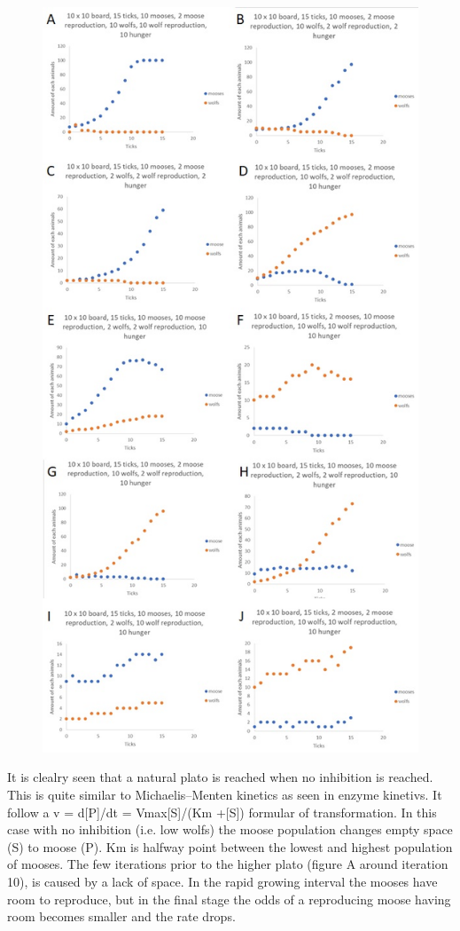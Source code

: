 \documentclass{article}
\begin{document}
    \begin{figure}[]
    	\centering
    	\includegraphics[scale=0.6]{./rawdata.jpg}	
    \end{figure}
    
        It is clealry seen that a natural plato is reached when no inhibition is reached. This is quite similar to Michaelis–Menten kinetics as seen in enzyme kinetivs. It follow a v = d[P]/dt = Vmax[S]/(Km +[S]) formular of transformation. In this case with no inhibition (i.e. low wolfs) the moose population changes empty space (S) to moose (P). Km is halfway point between the lowest and highest population of mooses. The few iterations prior to the higher plato (figure A around iteration 10), is caused by a lack of space. In the rapid growing interval the mooses have room to reproduce, but in the final stage the odds of a reproducing moose having room becomes smaller and the rate drops. \newline
        
\end{document}
